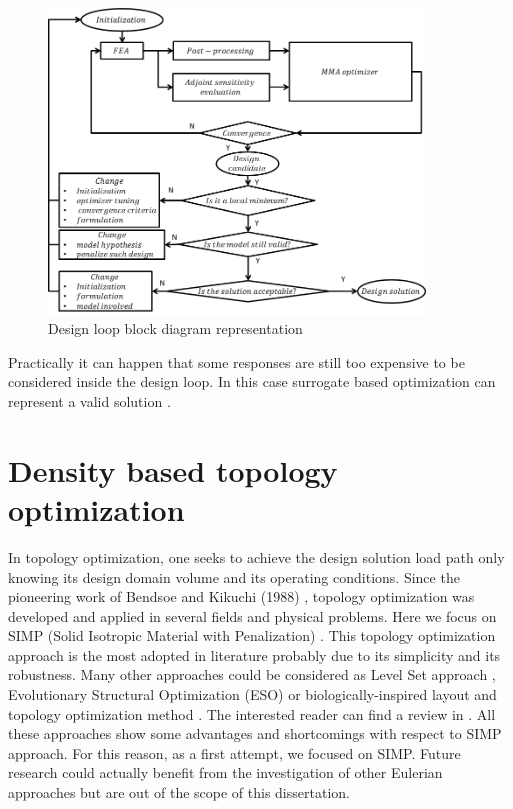 \begin{figure}[ht]
\centering
\includegraphics[width=10cm]{images/Ch2/design_loop}
\caption{Design loop block diagram representation}
\label{fig.2.8}
\end{figure}
Practically it can happen that some responses are still too expensive to be considered inside the design loop. In this case surrogate based optimization can represent a valid solution \cite{forrester2008engineering}.
\section{Density based topology optimization}
\label{sec:2.2}
In topology optimization, one seeks to achieve the design solution load path only knowing its design domain volume and its operating conditions. Since the pioneering work of Bendsoe and Kikuchi (1988) \cite{bendsoe1988generating}, topology optimization was developed and applied in several fields and physical problems. Here we focus on SIMP (Solid Isotropic Material with Penalization) \cite{bendsoe1989optimal}. This topology optimization approach is the most adopted in literature \cite{deaton2014survey} probably due to its simplicity and its robustness. Many other approaches could be considered as Level Set approach \cite{wang2003level}, Evolutionary Structural Optimization (ESO) \cite{xie1993simple} or biologically-inspired layout and topology optimization method \cite{kobayashi2010biologically}. The interested reader can find a review in \cite{deaton2014survey}. All these approaches show some advantages and shortcomings with respect to SIMP approach. For this reason, as a first attempt, we focused on SIMP. Future research could actually benefit from the investigation of other Eulerian approaches but are out of the scope of this dissertation.  

